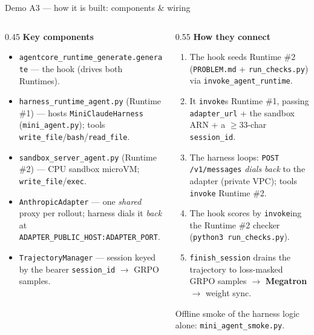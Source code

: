 \documentclass[aspectratio=169]{beamer}
\begin{document}
\begin{frame}{Demo A3 --- how it is built: components \& wiring}
  \begin{columns}[T]
    \begin{column}{0.45\textwidth}
      \scriptsize\textbf{Key components}
      \begin{itemize}\setlength\itemsep{0.15em}
        \item \texttt{agentcore\_runtime\_generate.generate} --- the hook (drives both Runtimes).
        \item \texttt{harness\_runtime\_agent.py} (Runtime \#1) --- hosts \texttt{MiniClaudeHarness} (\texttt{mini\_agent.py}); tools \texttt{write\_file}/\texttt{bash}/\texttt{read\_file}.
        \item \texttt{sandbox\_server\_agent.py} (Runtime \#2) --- CPU sandbox microVM; \texttt{write\_file}/\texttt{exec}.
        \item \texttt{AnthropicAdapter} --- one \emph{shared} proxy per rollout; harness dials it \emph{back} at \texttt{ADAPTER\_PUBLIC\_HOST:ADAPTER\_PORT}.
        \item \texttt{TrajectoryManager} --- session keyed by the bearer \texttt{session\_id} $\to$ GRPO samples.
      \end{itemize}
    \end{column}
    \begin{column}{0.55\textwidth}
      \scriptsize\textbf{How they connect}
      \begin{enumerate}\setlength\itemsep{0.15em}
        \item The hook seeds Runtime \#2 (\texttt{PROBLEM.md} + \texttt{run\_checks.py}) via \texttt{invoke\_agent\_runtime}.
        \item It \texttt{invoke}s Runtime \#1, passing \texttt{adapter\_url} + the sandbox ARN + a $\geq$33-char \texttt{session\_id}.
        \item The harness loops: \texttt{POST /v1/messages} \emph{dials back} to the adapter (private VPC); tools \texttt{invoke} Runtime \#2.
        \item The hook scores by \texttt{invoke}ing the Runtime \#2 checker (\texttt{python3 run\_checks.py}).
        \item \texttt{finish\_session} drains the trajectory to loss-masked GRPO samples $\to$ \textbf{Megatron} $\to$ weight sync.
      \end{enumerate}
      \vspace{0.2em}
      \scriptsize Offline smoke of the harness logic alone: \texttt{mini\_agent\_smoke.py}.
    \end{column}
  \end{columns}
\end{frame}
\end{document}
